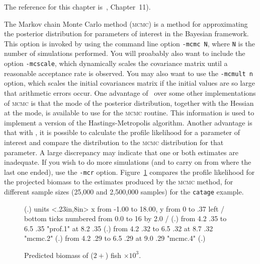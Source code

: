 \documentclass{admbmanual}
\begin{document}
The reference for this chapter is~\cite{gelmancarlinsternrubin}, Chapter~11).

The Markov chain Monte Carlo method (\textsc{mcmc}) is a method for approximating the
posterior distribution for parameters of interest in the Bayesian framework.
This option is invoked by using the command line option \texttt{-mcmc N},
where \texttt{N} is the number of simulations performed. You will proabably also
want to include the option \texttt{-mcscale}, which dynamically scales the
covariance matrix until a reasonable acceptance rate is observed.
You may also want to use the \texttt{-mcmult n} option, which scales the initial
covariances matrix if the initial values are so large that arithmetic
errors occur.
One advantage of \ADM\ over some other implementations of \textsc{mcmc} is that
the mode of the posterior distribution, together with the Hessian at
the mode, is available to use for the \textsc{mcmc} routine. This information
is used to implement a version of the Hastings-Metropolis algorithm.
Another advantage is that
with \ADM, it is possible to calculate the profile likelihood for a parameter
of interest and compare the distribution to the \textsc{mcmc} distribution for that
parameter. A large discrepancy may indicate that one or both estimates
are inadequate. If you wish to do more simulations (and to carry on from where
the last one ended), use the \texttt{-mcr} option. 
Figure~\ref{fig:06} compares the profile likelihood for the projected
biomass to the estimates produced by the \textsc{mcmc} method, for different sample sizes 
(25,000 and 2,500,000 samples) for the \texttt{catage} example.
\begin{figure}[h]
\centering\hskip1pt\beginpicture
  \setplotsymbol ({\eightrm .})
  \setcoordinatesystem units <.23in,8in>
  \setplotarea x from -1.00 to 18.00, y from 0 to .37 
  \axis left 
  /
  \axis bottom
  ticks numbered from 0.0 to 16 by 2.0 
  /
  \setplotsymbol ({\eighteenrm .}) %
\setdashpattern <2pt,2pt,2pt,3pt>
 \putrule from 4.2 .35 to 6.5 .35
 \plot  "prof.1" 
  at 8.2 .35
  \setplotsymbol ({\eightrm .})
\setdashpattern <1pt,3pt,4pt,3pt>
 \putrule from 4.2 .32 to 6.5 .32
  at 8.7 .32
 \plot  "mcmc.2" 
\setdashpattern <1pt,1pt,1pt,1pt>
  \setplotsymbol ({\tenrm .})
 \putrule from 4.2 .29 to 6.5 .29
  at 9.0 .29
 \plot  "mcmc.4" 
  \setplotsymbol ({\eighteenrm .}) %
\setdashpattern <1pt,3pt,4pt,3pt>
\endpicture
\caption{Predicted biomass of ($2+$) fish $\times 10^3$.}
\label{fig:06}
\end{figure}
\end{document}
